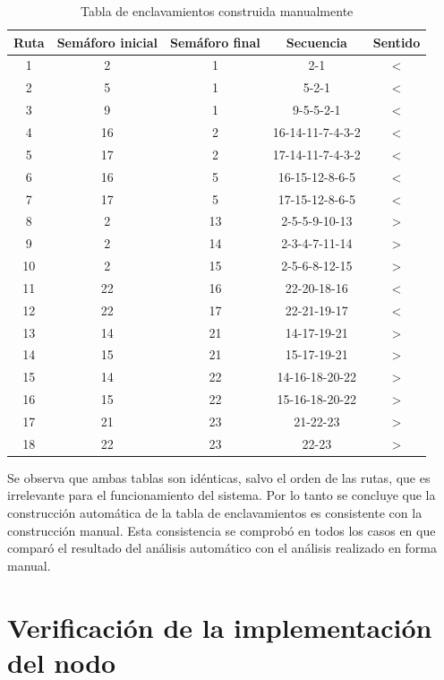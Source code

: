 	 \begin{table}[!hbt]
	\caption{Tabla de enclavamientos construida manualmente}
	\label{tabla_manual}
	\centering
	\begin{tabular}{ c  c  c  c  c }
	\hline
	Ruta & Semáforo inicial & Semáforo final & Secuencia & Sentido \\	
	\hline
		1 & 2 & 1 & 2-1 & < \\
		2 & 5 & 1 & 5-2-1 & < \\
		3 & 9 & 1 & 9-5-5-2-1 & < \\
		4 & 16 & 2 & 16-14-11-7-4-3-2 & < \\
		5 & 17 & 2 & 17-14-11-7-4-3-2 & < \\
		6 & 16 & 5 & 16-15-12-8-6-5 & < \\
		7 & 17 & 5 & 17-15-12-8-6-5 & < \\
		8 & 2 & 13 & 2-5-5-9-10-13 & > \\
		9 & 2 & 14 & 2-3-4-7-11-14 & > \\
		10 & 2 & 15 & 2-5-6-8-12-15 & > \\
		11 & 22 & 16 & 22-20-18-16 & < \\
		12 & 22 & 17 & 22-21-19-17 & < \\
		13 & 14 & 21 & 14-17-19-21 & > \\
		14 & 15 & 21 & 15-17-19-21 & > \\	
		15 & 14 & 22 & 14-16-18-20-22 & > \\	
		16 & 15 & 22 & 15-16-18-20-22 & > \\		
		17 & 21 & 23 & 21-22-23 & > \\	
		18 & 22 & 23 & 22-23 & > \\
	\end{tabular}
	\end{table}	 
	 
	 \vspace{2cm}
	 
	 Se observa que ambas tablas son idénticas, salvo el orden de las rutas, que es irrelevante para el funcionamiento del sistema. Por lo tanto se concluye que la construcción automática de la tabla de enclavamientos es consistente con la construcción manual. Esta consistencia se comprobó en todos los casos en que comparó el resultado del análisis automático con el análisis realizado en forma manual.			
				
\section{Verificación de la implementación del nodo}

